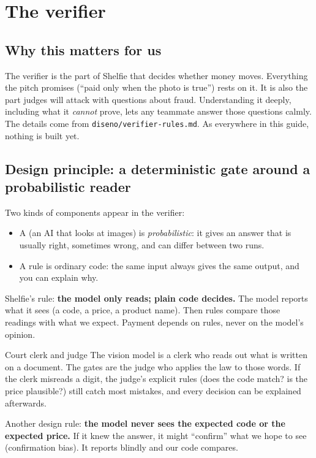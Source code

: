 \chapter{The verifier}
\newcommand{\cEightCode}[1]{\texttt{\scriptsize #1}}

\section*{Why this matters for us}
The verifier is the part of Shelfie that decides whether money moves. Everything the pitch promises (``paid only when the photo is true'') rests on it. It is also the part judges will attack with questions about fraud. Understanding it deeply, including what it \emph{cannot} prove, lets any teammate answer those questions calmly. The details come from \texttt{diseno/verifier-rules.md}. As everywhere in this guide, nothing is built yet.

\section{Design principle: a deterministic gate around a probabilistic reader}
Two kinds of components appear in the verifier:
\begin{itemize}
  \item A  (an AI that looks at images) is \emph{probabilistic}: it gives an answer that is usually right, sometimes wrong, and can differ between two runs.
  \item A  rule is ordinary code: the same input always gives the same output, and you can explain why.
\end{itemize}
Shelfie's rule: \textbf{the model only reads; plain code decides.} The model reports what it sees (a code, a price, a product name). Then rules compare those readings with what we expect. Payment depends on rules, never on the model's opinion.

\begin{analogybox}{Court clerk and judge}
The vision model is a clerk who reads out what is written on a document. The gates are the judge who applies the law to those words. If the clerk misreads a digit, the judge's explicit rules (does the code match? is the price plausible?) still catch most mistakes, and every decision can be explained afterwards.
\end{analogybox}

Another design rule: \textbf{the model never sees the expected code or the expected price.} If it knew the answer, it might ``confirm'' what we hope to see (confirmation bias). It reports blindly and our code compares.

